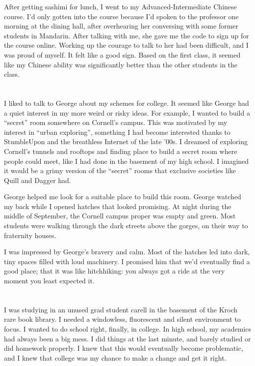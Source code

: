 After getting sashimi for lunch, I went to my Advanced-Intermediate Chinese
course.   I'd only gotten into the course because I'd spoken to the professor
one morning at the dining hall, after overhearing her conversing with some
former students in Mandarin.  After talking with me, she gave me the code to
sign up for the course online.  Working up the courage to talk to her had been
difficult, and I was proud of myself.  It felt like a good sign. Based on the
first class, it seemed like my Chinese ability was significantly better than the
other students in the class.

\section{}

I liked to talk to George about my schemes for college.  It seemed like George
had a quiet interest in my more weird or risky ideas.  For example, I wanted to
build a ``secret'' room somewhere on Cornell's campus.  This was motivated by my
interest in ``urban exploring'', something I had become interested thanks to
StumbleUpon and the breathless Internet of the late '00s.  I dreamed of
exploring Cornell's tunnels and rooftops and finding place to build a secret
room where people could meet, like I had done in the basement of my high school.
I imagined it would be a grimy version of the ``secret'' rooms that exclusive
societies like Quill and Dagger had. 

George helped me look for a suitable place to build this room.  George watched
my back while I opened hatches that looked promising.  At night during the
middle of September, the Cornell campus proper was empty and green.  Most students
were walking through the dark streets above the gorges, on their way to
fraternity houses.

I was impressed by George's bravery and calm.  Most of the hatches led into
dark, tiny spaces filled with loud machinery.  I promised him that we'd
eventually find a good place; that it was like hitchhiking: you always got a
ride at the very moment you least expected it.

\section{}

I was studying in an unused grad student carell in the basement of the Kroch
rare book library.  I needed a windowless, fluorescent and silent environment to
focus.  I wanted to do school right, finally, in college.  In high school, my
academics had always been a big mess.  I did things at the last minute, and
barely studied or did homework properly.  I knew that this would eventually
become problematic, and I knew that college was my chance to make a change and
get it right. 



